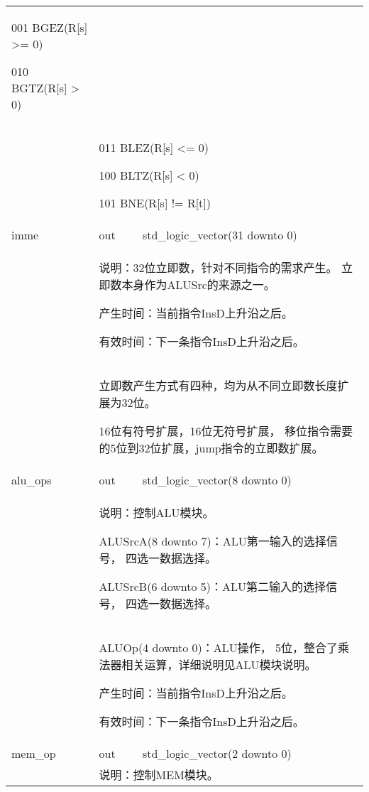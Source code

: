 \begin{tabularx}{\textwidth}{lll}
{                001 BGEZ(R[s] >= 0)

                010 BGTZ(R[s] > 0)
            } \\
            &
            \multicolumn{2}{X}{
                011 BLEZ(R[s] <= 0)

                100 BLTZ(R[s] < 0)

                101 BNE(R[s] != R[t])
            } \\
            \midrule
            imme            & out       & std\_logic\_vector(31 downto 0) \\
            \cmidrule(l){2-3}
            &
            \multicolumn{2}{X}{
                说明：32位立即数，针对不同指令的需求产生。%
                立即数本身作为ALUSrc的来源之一。

                产生时间：当前指令InsD上升沿之后。

                有效时间：下一条指令InsD上升沿之后。 
            } \\
            &
            \multicolumn{2}{X}{
                立即数产生方式有四种，均为从不同立即数长度扩展为32位。

                16位有符号扩展，16位无符号扩展，%
                移位指令需要的5位到32位扩展，jump指令的立即数扩展。
            } \\
            \midrule
            alu\_ops        & out       & std\_logic\_vector(8 downto 0) \\
            \cmidrule(l){2-3}
            &
            \multicolumn{2}{X}{
                说明：控制ALU模块。

                ALUSrcA(8 downto 7)：ALU第一输入的选择信号，%
                四选一数据选择。

                ALUSrcB(6 downto 5)：ALU第二输入的选择信号，%
                四选一数据选择。
            } \\
            &
            \multicolumn{2}{X}{
                ALUOp(4 downto 0)：ALU操作，%
                5位，整合了乘法器相关运算，详细说明见ALU模块说明。

                产生时间：当前指令InsD上升沿之后。

                有效时间：下一条指令InsD上升沿之后。 
            } \\
            \midrule
            mem\_op         & out       & std\_logic\_vector(2 downto 0) \\
            \cmidrule(l){2-3}
            &
            \multicolumn{2}{X}{
                说明：控制MEM模块。

}
\end{tabularx}

